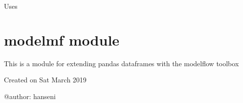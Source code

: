 \documentclass[letterpaper,10pt,english]{sphinxmanual}
\begin{document}
\begin{fulllineitems}
\begin{fulllineitems}
\end{fulllineitems}


\begin{fulllineitems}
\label{\detokenize{used/modelinvert:modelinvert.targets_instruments.__call__}}
\pysigstartsignatures
{}
\pysigstopsignatures
\sphinxAtStartPar
Uses {\hyperref[\detokenize{used/modelinvert:modelinvert.targets_instruments.targetseek}]{}}

\end{fulllineitems}


\end{fulllineitems}


\sphinxstepscope


\section{modelmf module}
\label{\detokenize{used/modelmf:module-modelmf}}\label{\detokenize{used/modelmf:modelmf-module}}\label{\detokenize{used/modelmf::doc}}
\sphinxAtStartPar
This is a module for extending pandas dataframes with the modelflow toolbox

\sphinxAtStartPar
Created on Sat March 2019

\sphinxAtStartPar
@author: hanseni
\end{document}
